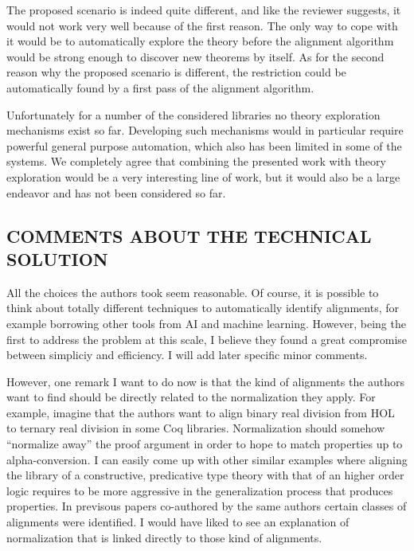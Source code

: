 \documentclass[]{scrartcl}
\begin{document}
The proposed scenario is indeed quite different, and like the reviewer 
suggests, it would not work very well because of the first reason.
The only way to cope with it would be to automatically explore the theory 
before the alignment algorithm would be strong enough to discover new theorems 
by itself. As for the second reason why the proposed scenario is different, the 
restriction could be automatically found by a first pass of the alignment
algorithm.
 
Unfortunately for a number of the considered libraries no theory exploration 
mechanisms exist so far. Developing such mechanisms would in particular require 
powerful general purpose automation, which also has been limited in some of the 
systems. We completely agree that combining the presented work with theory 
exploration would be a very interesting line of work, but it would also be a 
large endeavor and has not been considered so far.


\subsection*{COMMENTS ABOUT THE TECHNICAL SOLUTION}
\begin{leftbar}All the choices the authors took seem reasonable. Of course, it 
is possible to think about totally different techniques to automatically 
identify alignments, for example borrowing other tools from AI and machine 
learning. However, being the first to address the problem at this scale, I 
believe they found a great compromise between simpliciy and efficiency. I will 
add later specific minor comments.

However, one remark I want to do now is that the kind of alignments the authors 
want to find should be directly related to the normalization they apply. For 
example, imagine that the authors want to align binary real division from HOL 
to ternary real division in some Coq libraries. Normalization should somehow 
``normalize away'' the proof argument in order to hope to match properties up 
to alpha-conversion. I can easily come up with other similar examples where 
aligning the library of a constructive, predicative type theory with that of an 
higher order logic requires to be more aggressive in the generalization process 
that produces properties. In previsous papers co-authored by the same authors 
certain classes of alignments were identified. I would have liked to see an 
explanation of normalization that is linked directly to those kind of 
alignments.
\end{leftbar}
\end{document}
